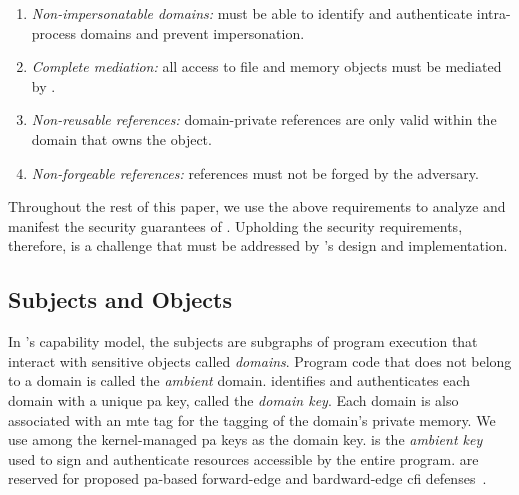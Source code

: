 \renewcommand{\labelenumi}{\secreq{R\arabic{enumi}}}
\begin{enumerate}
	\item \emph{Non-impersonatable domains:} \thename must be able to identify and authenticate intra-process domains and prevent impersonation.
	\item \emph{Complete mediation:} all access to file and memory objects must be mediated by \thename.
	\item \emph{Non-reusable references:} \thename domain-private references are only valid within the domain that owns the object.
	\item \emph{Non-forgeable references:} \thename references must not be forged by the adversary.
\end{enumerate}
\renewcommand{\labelenumi}{\arabic{enumi}}

Throughout the rest of this paper, we use the above requirements to analyze and manifest the security guarantees of \thename.
Upholding the security requirements, therefore, is a challenge that must be addressed by \thename's design and implementation.


\subsection{Subjects and Objects}
\label{sec:overview:domains}

In \thename's capability model, the subjects are subgraphs of program execution that interact with sensitive objects called \emph{\thename domains}.
Program code that does not belong to a domain is called the \emph{ambient} domain.
\thename identifies and authenticates each domain with a unique \gls{pa} key, called the \emph{domain key}.
Each domain is also associated with an \gls{mte} tag for the tagging of the domain's private memory.
We use  among the kernel-managed \gls{pa} keys as the domain key.
 is the \emph{ambient key} used to sign and authenticate resources accessible by the entire program.
 are reserved for proposed \gls{pa}-based forward-edge and bardward-edge \gls{cfi} defenses~\cite{pac-it-up,pacstack,apple-pac,qualcomm-pac}.

